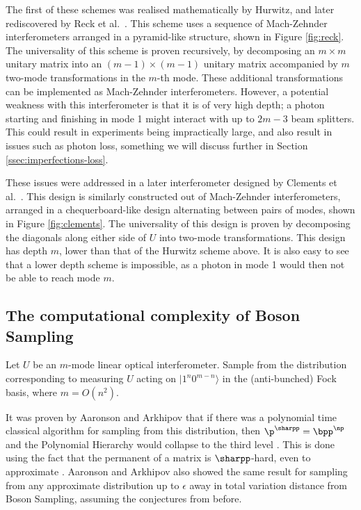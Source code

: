 The first of these schemes was realised mathematically by Hurwitz, and later rediscovered by Reck et al.~\cite{hurwitz1897, reck1994}. This scheme uses a sequence of Mach-Zehnder interferometers arranged in a pyramid-like structure, shown in Figure \ref{fig:reck}. The universality of this scheme is proven recursively, by decomposing an $m\times m$ unitary matrix into an $(m-1)\times(m-1)$ unitary matrix accompanied by $m$ two-mode transformations in the $m$-th mode. These additional transformations can be implemented as Mach-Zehnder interferometers. However, a potential weakness with this interferometer is that it is of very high depth; a photon starting and finishing in mode 1 might interact with up to $2m-3$ beam splitters. This could result in experiments being impractically large, and also result in issues such as photon loss, something we will discuss further in Section \ref{ssec:imperfections-loss}.

These issues were addressed in a later interferometer designed by Clements et al.~\cite{clements2016}. This design is similarly constructed out of Mach-Zehnder interferometers, arranged in a chequerboard-like design alternating between pairs of modes, shown in Figure \ref{fig:clements}. The universality of this design is proven by decomposing the diagonals along either side of $U$ into two-mode transformations. This design has depth $m$, lower than that of the Hurwitz scheme above. It is also easy to see that a lower depth scheme is impossible, as a photon in mode 1 would then not be able to reach mode $m$.

\subsection{The computational complexity of Boson Sampling}
\label{ssec:cc-bs}

\begin{problem} Let $U$ be an $m$-mode linear optical interferometer. Sample from the distribution corresponding to measuring $U$ acting on $|1^n0^{m-n}\rangle$ in the (anti-bunched) Fock basis, where $m=O(n^2)$.
\end{problem}

It was proven by Aaronson and Arkhipov that if there was a polynomial time classical algorithm for sampling from this distribution, then $\p^{\sharpp} = \bpp^{\np}$ and the Polynomial Hierarchy would collapse to the third level \cite{aaronson2010report, aaronson2011}. This is done using the fact that the permanent of a matrix is $\sharpp$-hard, even to approximate \cite{valiant1979, aaronson2011sharpp}. 
Aaronson and Arkhipov also showed the same result for sampling from any approximate distribution up to $\epsilon$ away in total variation distance from Boson Sampling, assuming the conjectures from before.

